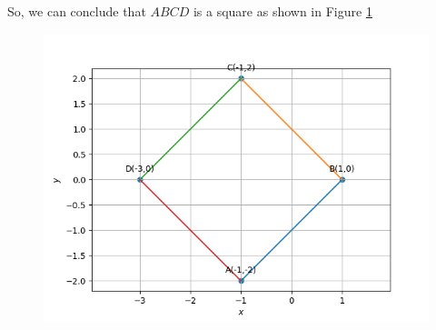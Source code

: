 \documentclass[12pt]{article}
\begin{document}
\begin{enumerate}
	So, we can conclude that $ABCD$ is a square as shown in Figure \ref{fig:Fig1}
 
\begin{figure}[!h]
	\begin{center} 
	    \includegraphics[width=\columnwidth]{figs/quad1}
	\end{center}
\caption{}
\label{fig:Fig1}
\end{figure}


\end{enumerate}
\end{document}
